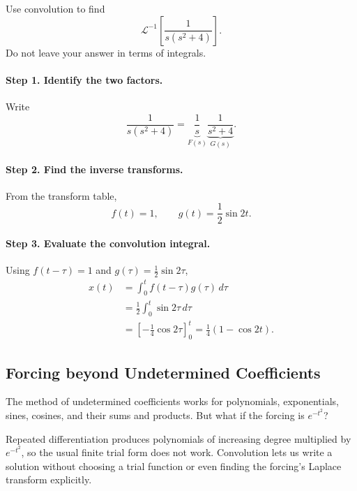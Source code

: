 \documentclass[10pt,letterpaper]{article}
\begin{document}
\begin{example}[4]{
Use convolution to find
\[
\mathcal L^{-1}\left[\frac{1}{s(s^2+4)}\right].
\]
Do not leave your answer in terms of integrals.
}

\paragraph{Step 1. Identify the two factors.}
Write
\[
\frac{1}{s(s^2+4)}
=
\underbrace{\frac1s}_{F(s)}
\underbrace{\frac1{s^2+4}}_{G(s)}.
\]

\paragraph{Step 2. Find the inverse transforms.}
From the transform table,
\[
f(t)=1,
\qquad
g(t)=\frac12\sin2t.
\]

\paragraph{Step 3. Evaluate the convolution integral.}
Using $f(t-\tau)=1$ and
$g(\tau)=\frac12\sin2\tau$,
\begin{align*}
x(t)
&=\int_0^t f(t-\tau)g(\tau)\,d\tau\\
&=\frac12\int_0^t\sin2\tau\,d\tau\\
&=\left[-\frac14\cos2\tau\right]_0^t=\boxed{\frac14(1-\cos2t).}
\end{align*}
\end{example}

\subsection{Forcing beyond Undetermined Coefficients}

The method of undetermined coefficients works for polynomials,
exponentials, sines, cosines, and their sums and products.
But what if the forcing is $e^{-t^2}$?

Repeated differentiation produces polynomials of increasing
degree multiplied by $e^{-t^2}$, so the usual finite trial
form does not work. Convolution lets us write a solution
without choosing a trial function or even finding the
forcing's Laplace transform explicitly.
\end{document}
